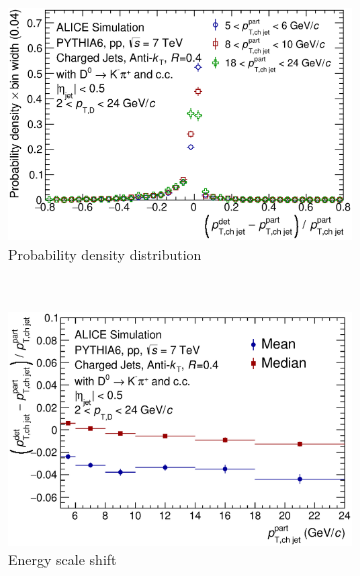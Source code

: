 \begin{figure}[tbh]
\centering
\begin{subfigure}[b]{0.49\textwidth}
  \centering
  \includegraphics[width=1.0\linewidth]{img/HQ16_Simulation_DetectorResponse}
  \caption{Probability density distribution}
  \label{fig:HQ16_Simulation_DetectorResponse}
\end{subfigure}\\
\begin{subfigure}{0.49\textwidth}
  \centering
  \includegraphics[width=1.0\linewidth]{img/HQ16_Simulation_EnergyScaleShift}
  \caption{Energy scale shift}
  \label{fig:HQ16_Simulation_EnergyScaleShift}
\end{subfigure}
\begin{subfigure}{0.49\textwidth}
  \centering

\end{subfigure}
\end{figure}
